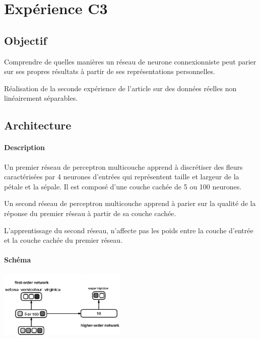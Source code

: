 \section{Expérience C3} 
  \subsection{Objectif}
    Comprendre de quelles manières un réseau de neurone connexionniste peut parier sur ses propres résultats
    à partir de ses représentations personnelles.

    
    Réalisation de la seconde expérience de l'article \cite{Cleeremans_2007} sur des données réelles
    non linéairement séparables.
  
  
  \subsection{Architecture}
    \paragraph{Description}
      Un premier réseau de perceptron multicouche apprend à discrétiser des fleurs caractérisées
      par 4 neurones d'entrées qui représentent taille et largeur de la pétale et la sépale. 
      Il est composé d'une couche cachée de 5 ou 100 neurones.
      
      Un second réseau de perceptron multicouche apprend à parier sur la qualité de la réponse
      du premier réseau à partir de sa couche cachée.
      
      L'apprentissage du second réseau, n'affecte pas les poids entre la couche d'entrée et la 
      couche cachée du premier réseau.

    \paragraph{Schéma}
      \begin{center}
	\includegraphics[width=230px]{data/expC3/schema.png}
      \end{center}
      
